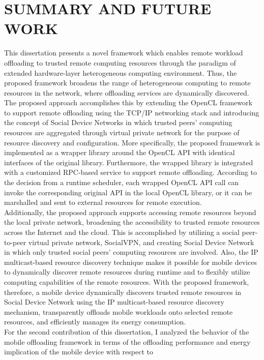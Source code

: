 \chapter{SUMMARY AND FUTURE WORK}
\label{chap:summary}
%
This dissertation presents a novel framework which enables remote workload
offloading to trusted remote computing resources through the
paradigm of extended hardware-layer heterogeneous computing environment.
%
Thus, the proposed framework broadens the range of heterogeneous
computing to remote resources in the network, where offloading services
are dynamically discovered. 
%
The proposed approach accomplishes this by extending the OpenCL framework to
support remote offloading using the TCP/IP networking stack and 
introducing the concept of Social Device Networks in which trusted
peers' computing resources are aggregated through virtual private
network for the purpose of resource discovery and configuration.
%
More specifically, the proposed framework is implemented as a wrapper
library around the OpenCL API with identical interfaces of the 
original library.
%
Furthermore, the wrapped library is integrated with a customized RPC-based
service to support remote offloading.
%
According to the decision from a runtime scheduler, each wrapped OpenCL API call
can invoke the corresponding original API in the local OpenCL library, or it
can be marshalled and sent to external resources for remote
execution.\\
%
Additionally, the proposed approach supports accessing remote resources beyond
the local private network, broadening the accessibility to trusted
remote resources across the Internet and the cloud.
%
This is accomplished by utilizing a social peer-to-peer virtual private
network, SocialVPN, and creating Social Device Network in which only
trusted social peers' computing resources are involved.
%
Also, the IP multicast-based resource discovery technique makes it possible
for mobile devices to dynamically discover remote resources during
runtime and to flexibly utilize computing capabilities of the remote resources.
%
With the proposed framework, therefore, a mobile device dynamically
discovers trusted remote resources in Social Device Network using the IP
multicast-based resource discovery mechanism, transparently offloads 
mobile workloads onto selected remote resources, and efficiently manages 
its energy consumption.\\   
%
For the second contribution of this dissertation, I analyzed the
behavior of the mobile offloading framework in terms of the offloading
performance and energy implication of the mobile device with respect to
